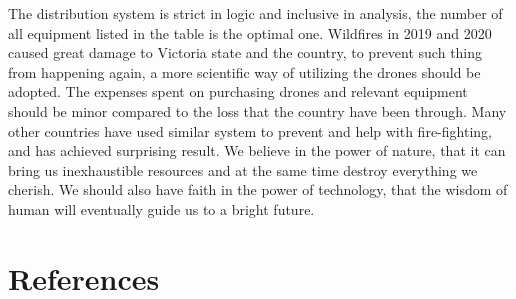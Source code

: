 \documentclass{mcmthesis}
\begin{document}
\begin{appendices}
The distribution system is strict in logic and inclusive in analysis, the number of all equipment listed in the table is the optimal one. Wildfires in 2019 and 2020 caused great damage to Victoria state and the country, to prevent such thing from happening again, a more scientific way of utilizing the drones should be adopted. The expenses spent on purchasing drones and relevant equipment should be minor compared to the loss that the country have been through. Many other countries have used similar system to prevent and help with fire-fighting, and has achieved surprising result. We believe in the power of nature, that it can bring us inexhaustible resources and at the same time destroy everything we cherish. We should also have faith in the power of technology, that the wisdom of human will eventually guide us to a bright future.  



\section{References}





\end{appendices}
\end{document}
